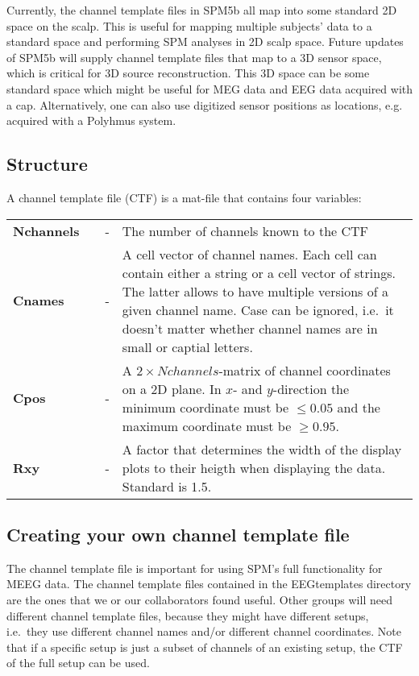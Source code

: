 Currently, the channel template files in SPM5b all map into some standard
2D space on the scalp. This is useful for mapping multiple subjects'
data to a standard space and performing SPM analyses in 2D scalp
space. Future updates of SPM5b will supply channel
template files that map to a 3D sensor space, which is critical for
3D source reconstruction. This 3D space can be some standard space
which might be useful for MEG data and EEG data acquired with a
cap. Alternatively, one can also use digitized sensor positions as
locations, e.g. acquired with a Polyhmus system.

\subsection{Structure}
A channel template file (CTF) is a mat-file that contains four
variables:\\

\begin{tabular}{llcp{9cm}}
{\bf Nchannels} & &  - & The number of channels known to the CTF\\
{\bf Cnames}&  & - & A cell vector of channel names. Each cell can
contain either a string or a cell vector of strings. The latter allows
to have multiple versions of a given channel name. Case can be
ignored, i.e.~it doesn't matter whether channel names are in small or
captial letters.\\
{\bf Cpos} & & - & A $2 \times Nchannels$-matrix of channel
coordinates on a 2D plane. In $x$- and $y$-direction the minimum
coordinate must be $\leq 0.05$ and the maximum coordinate
must be $\geq 0.95$. \\ 
{\bf Rxy} & & - & A factor that determines the width of the display
plots to their heigth when displaying the data. Standard is 1.5. \\
\end{tabular}

\subsection{Creating your own channel template file}
The channel template file is important for using SPM's full
functionality for MEEG data. The channel template files contained in
the EEGtemplates directory are the ones that we or our collaborators
found useful. Other groups will need different channel template files,
because they might have different setups, i.e.~they use different
channel names and/or different channel coordinates. Note that if a
specific setup is just a subset of channels of an existing setup, the
CTF of the full setup can be used.  

